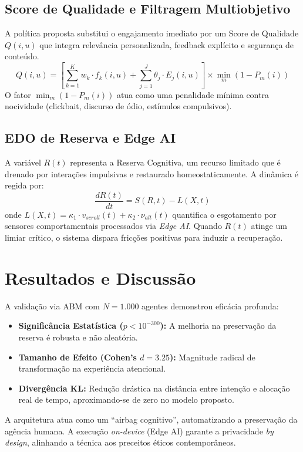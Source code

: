 \documentclass{sbc2023}
\begin{document}
\subsection{Score de Qualidade e Filtragem Multiobjetivo}
A política proposta substitui o engajamento imediato por um Score de Qualidade $Q(i, u)$ que integra relevância personalizada, feedback explícito e segurança de conteúdo.
\begin{equation} \label{eq:score}
Q(i, u) = \left[ \sum_{k=1}^{K} w_k \cdot f_k(i, u) + \sum_{j=1}^{J} \theta_j \cdot E_j(i, u) \right] \times \min_m (1 - P_m(i))
\end{equation}
O fator $\min_m (1 - P_m(i))$ atua como uma penalidade mínima contra nocividade (clickbait, discurso de ódio, estímulos compulsivos).

\subsection{EDO de Reserva e Edge AI}
A variável $R(t)$ representa a Reserva Cognitiva, um recurso limitado que é drenado por interações impulsivas e restaurado homeostaticamente. A dinâmica é regida por:
\begin{equation} \label{eq:edo}
\frac{dR(t)}{dt} = S(R, t) - L(X, t)
\end{equation}
onde $L(X, t) = \kappa_1 \cdot v_{scroll}(t) + \kappa_2 \cdot \nu_{alt}(t)$ quantifica o esgotamento por sensores comportamentais processados via \textit{Edge AI}. Quando $R(t)$ atinge um limiar crítico, o sistema dispara fricções positivas para induzir a recuperação.

\section{Resultados e Discussão}
A validação via ABM com $N = 1.000$ agentes demonstrou eficácia profunda:
\begin{itemize}
    \item \textbf{Significância Estatística ($p < 10^{-300}$):} A melhoria na preservação da reserva é robusta e não aleatória.
    \item \textbf{Tamanho de Efeito (Cohen's $d = 3.25$):} Magnitude radical de transformação na experiência atencional.
    \item \textbf{Divergência KL:} Redução drástica na distância entre intenção e alocação real de tempo, aproximando-se de zero no modelo proposto.
\end{itemize}

A arquitetura atua como um ``airbag cognitivo'', automatizando a preservação da agência humana. A execução \textit{on-device} (Edge AI) garante a privacidade \textit{by design}, alinhando a técnica aos preceitos éticos contemporâneos.
\end{document}
